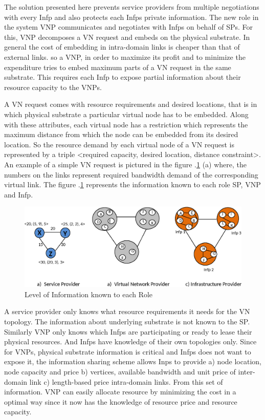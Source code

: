 \documentclass[article,dr=phil,type=msc ,colorback,accentcolor=tud4b]{tudthesis}
\begin{document}
\begin{enumerate}[label=(\Alph*)]
The solution presented here prevents service providers from multiple negotiations with every Infp and also protects each Infps private information. The new role in the system VNP communicates and negotiates with Infps on behalf of SPs. For this, VNP decomposes a VN request and embeds on the physical substrate. In general the cost of embedding in intra-domain links is cheaper than that of external links. so a VNP, in order to maximize its profit and to minimize the expenditure tries to embed maximum parts of a VN request in the same substrate. This requires each Infp to expose partial information about their resource capacity to the VNPs. 

A VN request comes with resource requirements and desired locations, that is in which physical substrate a particular virtual node has to be embedded. Along with these attributes, each virtual node has a restriction which represents the maximum distance from which the node can be embedded from its desired location. So the resource demand by each virtual node of a VN request is represented by a triple <required capacity, desired location, distance constraint>. An example of a simple VN request is pictured in the figure .\ref{IDE_VN} (a) where, the numbers on the links represent required bandwidth demand of the corresponding virtual link. The figure .\ref{IDE_VN} represents the information known to each role SP, VNP and Infp.
\begin{figure}[h]
	\centering
	\includegraphics[width=\linewidth]{inter-domain}
	\caption{Level of Information known to each Role}
	\label{IDE_VN}
\end{figure}

A service provider only knows what resource requirements it needs for the VN topology. The information about underlying substrate is not known to the SP. Similarly VNP only knows which Infps are participating or ready to lease their physical resources. And Infps have knowledge of their own topologies only. 
Since for VNPs, physical substrate information is critical and Infps does not want to expose it, the information sharing scheme allows Inps to provide a) node location, node capacity and price b) vertices, available bandwidth and unit price of inter-domain link c) length-based price intra-domain links. From this set of information. VNP can easily allocate resource by minimizing the cost in a optimal way since it now has the knowledge of resource price and resource capacity. 


\end{enumerate}
\end{document}
